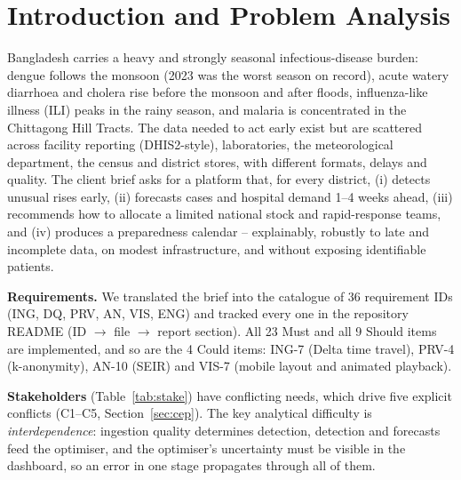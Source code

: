 \documentclass[conference]{IEEEtran}
\begin{document}
\section{Introduction and Problem Analysis}
Bangladesh carries a heavy and strongly seasonal infectious-disease burden: dengue follows the monsoon (2023
was the worst season on record), acute watery diarrhoea and cholera rise before the monsoon and after floods,
influenza-like illness (ILI) peaks in the rainy season, and malaria is concentrated in the Chittagong Hill
Tracts. The data needed to act early exist but are scattered across facility reporting (DHIS2-style),
laboratories, the meteorological department, the census and district stores, with different formats,
delays and quality. The client brief asks for a platform that, for every district, (i) detects unusual
rises early, (ii) forecasts cases and hospital demand 1--4 weeks ahead, (iii) recommends how to allocate a
limited national stock and rapid-response teams, and (iv) produces a preparedness calendar -- explainably,
robustly to late and incomplete data, on modest infrastructure, and without exposing identifiable patients.

\textbf{Requirements.} We translated the brief into the catalogue of 36 requirement IDs (ING, DQ, PRV, AN,
VIS, ENG) and tracked every one in the repository README (ID $\rightarrow$ file $\rightarrow$ report section).
All 23 Must and all 9 Should items are implemented, and so are the 4 Could items: ING-7 (Delta time travel),
PRV-4 (k-anonymity), AN-10 (SEIR) and VIS-7 (mobile layout and animated playback).

\textbf{Stakeholders} (Table~\ref{tab:stake}) have conflicting needs, which drive five explicit
conflicts (C1--C5, Section~\ref{sec:cep}). The key analytical difficulty is \emph{interdependence}: ingestion
quality determines detection, detection and forecasts feed the optimiser, and the optimiser's uncertainty
must be visible in the dashboard, so an error in one stage propagates through all of them.
\end{document}
